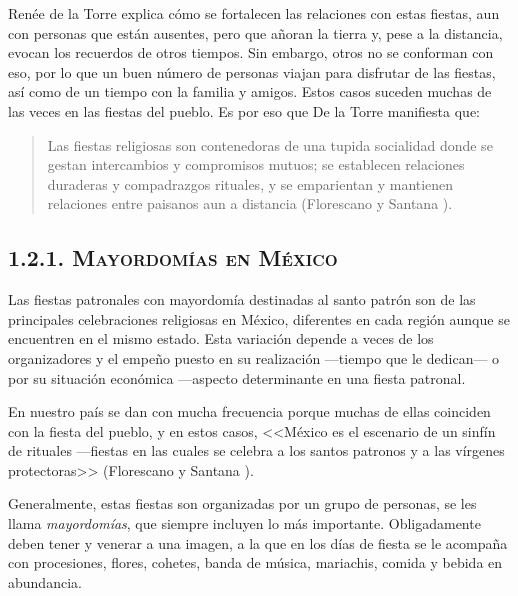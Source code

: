 \documentclass[14pt,letterpaper,twoside]{extbook} %
\begin{document}
\noindent Renée de la Torre explica cómo se fortalecen las relaciones con estas fiestas, aun con personas que están ausentes, pero que añoran la tierra y, pese a la distancia, evocan los recuerdos de otros tiempos. Sin embargo, otros no se conforman con eso, por lo que un buen número de personas viajan para disfrutar de las fiestas, así como de un tiempo con la familia y amigos. Estos casos suceden muchas de las veces en las fiestas del pueblo. Es por eso que De la Torre manifiesta que:

\begin{quotation}
\noindent Las fiestas religiosas son contenedoras de una tupida socialidad donde se gestan intercambios y compromisos mutuos; se establecen relaciones duraderas y compadrazgos rituales, y se emparientan y mantienen relaciones entre paisanos aun a distancia (Florescano y Santana ).
\end{quotation}

\subsection*{\mdseries\large\textsc{1.2.1. Mayordomías en México}}

\noindent Las fiestas patronales con mayordomía destinadas al santo patrón son de las principales celebraciones religiosas en México, diferentes en cada región aunque se encuentren en el mismo estado. Esta variación depende a veces de los organizadores y el empeño puesto en su realización ---tiempo que le dedican--- o por su situación económica ---aspecto determinante en una fiesta patronal.

En nuestro país se dan con mucha frecuencia porque muchas de ellas coinciden con la fiesta del pueblo, y en estos casos, <<México es el escenario de un sinfín de rituales ---fiestas en las cuales se celebra a los santos patronos y a las vírgenes protectoras>> (Florescano y Santana ).

Generalmente, estas fiestas son organizadas por un grupo de personas, se les llama \textit{mayordomías}, que siempre incluyen lo más importante. Obligadamente deben tener y venerar a una imagen, a la que en los días de fiesta se le acompaña con procesiones, flores, cohetes, banda de música, mariachis, comida y bebida en abundancia.
\end{document}
